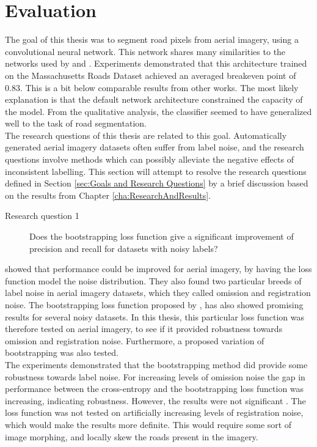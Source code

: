 \section{Evaluation}
\label{sec:SummaryDiscussion}
The goal of this thesis was to segment road pixels from aerial imagery, using a convolutional neural network. This network shares many similarities to the networks used by \cite{Mnih_aerial_images_noisy} and \citep{MnihThesis}. Experiments demonstrated that this architecture trained on the Massachusetts Roads Dataset achieved an averaged breakeven point of 0.83. This is a bit below comparable results from other works. The most likely explanation is that the default network architecture constrained the capacity of the model. From the qualitative analysis, the classifier seemed to have generalized well to the task of road segmentation.\\

 The research questions of this thesis are related to this goal. Automatically generated aerial imagery datasets often suffer from label noise, and the research questions involve methods which can possibly alleviate the negative effects of inconsistent labelling. This section will attempt to resolve the research questions defined in Section \ref{sec:Goals and Research Questions} by a brief discussion based on the results from Chapter \ref{cha:ResearchAndResults}.\\
\begin{description}
\item[Research question 1] Does the bootstrapping loss function give a significant improvement of precision and recall for datasets with noisy labels?
\end{description}

\cite{Mnih_aerial_images_noisy} showed that performance could be improved for aerial imagery, by having the loss function model the noise distribution. They also found two particular breeds of label noise in aerial imagery datasets, which they called omission and registration noise. The bootstrapping loss function proposed by \cite{Reed_noisy_labels_bootstrapping}, has also showed promising results for several noisy datasets. In this thesis, this particular loss function was therefore tested on aerial imagery, to see if it provided robustness towards omission and registration noise. Furthermore, a proposed variation of bootstrapping was also tested.\\

The experiments demonstrated that the bootstrapping method did provide some robustness towards label noise. For increasing levels of omission noise the gap in performance between the cross-entropy and the bootstrapping loss function was increasing, indicating robustness. However, the results were not significant . The loss function was not tested on artificially increasing levels of registration noise, which would make the results more definite. This would require some sort of image morphing, and locally skew the roads present in the imagery. \\

